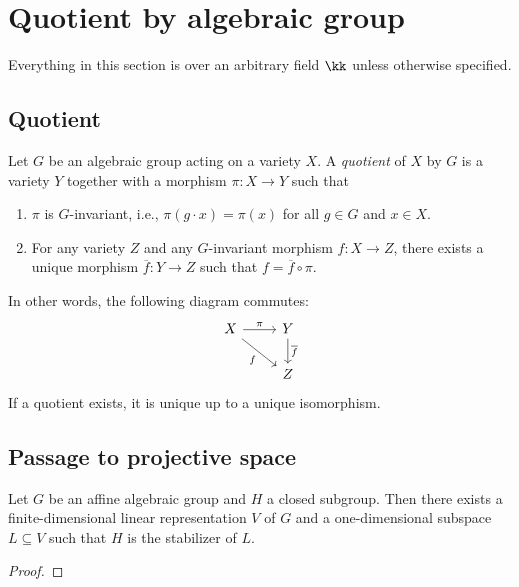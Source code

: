 \section{Quotient by algebraic group}

Everything in this section is over an arbitrary field \(\kk\) unless otherwise specified.

\subsection{Quotient}

    \begin{definition}\label{def:quotient_of_variety_by_group_action}
        Let \(G\) be an algebraic group acting on a variety \(X\).
        A \emph{quotient} of \(X\) by \(G\) is a variety \(Y\) together with a morphism \(\pi: X \to Y\) such that
        \begin{enumerate}
            \item \(\pi\) is \(G\)-invariant, i.e., \(\pi(g \cdot x) = \pi(x)\) for all \(g \in G\) and \(x \in X\).
            \item For any variety \(Z\) and any \(G\)-invariant morphism \(f: X \to Z\), there exists a unique morphism \(\overline{f}: Y \to Z\) such that \(f = \overline{f} \circ \pi\).
        \end{enumerate}
        In other words, the following diagram commutes:
        \[
            \begin{tikzcd}
                X \arrow[r, "\pi"] \arrow[rd, "f"'] & Y \arrow[d, "\overline{f}"] \\
                & Z
            \end{tikzcd}
        \]
        If a quotient exists, it is unique up to a unique isomorphism.
    \end{definition}


\subsection{Passage to projective space}

    \begin{theorem}\label{thm:closed_subgroup_of_affine_algebraic_group_can_be_realized_as_stabilizer_of_line}
        Let \(G\) be an affine algebraic group and \(H\) a closed subgroup.
        Then there exists a finite-dimensional linear representation \(V\) of \(G\) and a one-dimensional subspace \(L \subseteq V\) such that \(H\) is the stabilizer of \(L\).
    \end{theorem}
    \begin{proof}
    \end{proof}


